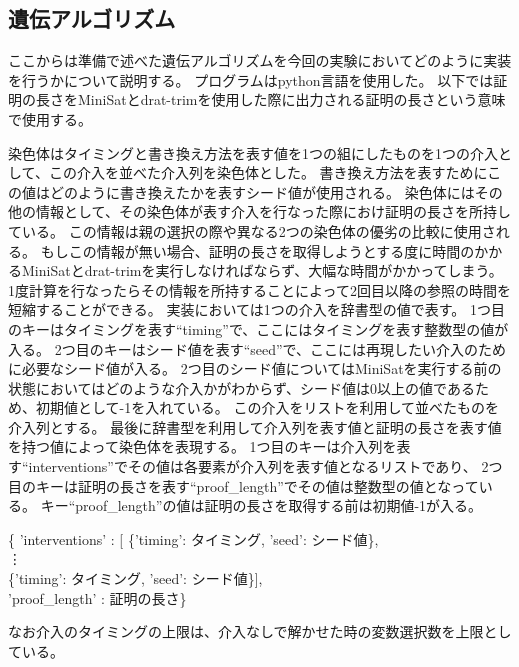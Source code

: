\subsection{遺伝アルゴリズム}



ここからは準備で述べた遺伝アルゴリズムを今回の実験においてどのように実装を行うかについて説明する。
プログラムはpython言語を使用した。
以下では証明の長さをMiniSatとdrat-trimを使用した際に出力される証明の長さという意味で使用する。

染色体はタイミングと書き換え方法を表す値を1つの組にしたものを1つの介入として、この介入を並べた介入列を染色体とした。
書き換え方法を表すためにこの値はどのように書き換えたかを表すシード値が使用される。
染色体にはその他の情報として、その染色体が表す介入を行なった際におけ証明の長さを所持している。
この情報は親の選択の際や異なる2つの染色体の優劣の比較に使用される。
もしこの情報が無い場合、証明の長さを取得しようとする度に時間のかかるMiniSatとdrat-trimを実行しなければならず、大幅な時間がかかってしまう。
1度計算を行なったらその情報を所持することによって2回目以降の参照の時間を短縮することができる。
実装においては1つの介入を辞書型の値で表す。
1つ目のキーはタイミングを表す``timing''で、ここにはタイミングを表す整数型の値が入る。
2つ目のキーはシード値を表す``seed''で、ここには再現したい介入のために必要なシード値が入る。
2つ目のシード値についてはMiniSatを実行する前の状態においてはどのような介入かがわからず、シード値は0以上の値であるため、初期値として-1を入れている。
この介入をリストを利用して並べたものを介入列とする。
最後に辞書型を利用して介入列を表す値と証明の長さを表す値を持つ値によって染色体を表現する。
1つ目のキーは介入列を表す``interventions''でその値は各要素が介入列を表す値となるリストであり、
2つ目のキーは証明の長さを表す``proof\_length''でその値は整数型の値となっている。
キー``proof\_length''の値は証明の長さを取得する前は初期値-1が入る。
\begin{flushleft}
             \{ 'interventions'  : [ \{'timing': タイミング,  'seed': シード値\},\\
    \phantom{\{ 'interventions'  : [ \{'timing': タイミング,}\vdots\\
    \phantom{\{ 'interventions'  : [}\{'timing': タイミング,  'seed': シード値\}],\\
    \phantom{\{}'proof\_length'  : 証明の長さ\}
\end{flushleft}
なお介入のタイミングの上限は、介入なしで解かせた時の変数選択数を上限としている。

